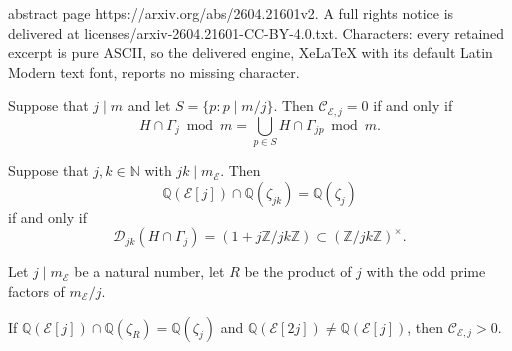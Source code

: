 \documentclass[10pt,a4paper]{amsart}
\newcommand{\Cc}{\mathcal{C}}
\newcommand{\Dc}{\mathcal{D}}
\newcommand{\E}{\mathcal{E}}
\newcommand{\N}{\mathbb{N}}
\newcommand{\Q}{\mathbb{Q}}
\newcommand{\Z}{\mathbb{Z}}
\begin{document}
abstract page https://arxiv.org/abs/2604.21601v2. A full rights notice is delivered at licenses/arxiv-2604.21601-CC-BY-4.0.txt. Characters: every retained excerpt is pure ASCII, so the delivered engine, XeLaTeX with its default Latin Modern text font, reports no missing character.
\begin{prop}\label{prop:Cejiff} Suppose that $j \mid m$ and let $S = \{p : p \mid m/j\}$. Then $\Cc_{\E, j} = 0$ if and only if 
\[H \cap \Gamma_j \bmod m = \bigcup_{p \in S}H \cap \Gamma_{jp} \bmod m.\]
\end{prop}

\begin{lemma}\label{lem:cyclotomic-lemma}
    Suppose that $j, k \in \N$ with $jk \mid m_\E$. Then 
    \[\Q(\E[j]) \cap \Q(\zeta_{jk}) = \Q(\zeta_j)\]
    if and only if 
    \[\Dc_{jk}(H \cap \Gamma_j) = (1 + j\Z/jk\Z) \subset (\Z/jk\Z)^\times.\]
\end{lemma}

\begin{theorem} \label{T4b}
    Let $j \mid m_\E$ be a natural number, let $R$ be the product of $j$ with the odd prime factors of $m_\E/j$.
    
    If $\mathbb{Q}(\E[j]) \cap \mathbb{Q}(\zeta_{R}) =\mathbb{Q}(\zeta_{j}) $ and $\mathbb{Q}(\E[2j]) \neq \mathbb{Q}(\E[j])$, then $\mathcal{C}_{\E,j}>0$.
\end{theorem}
\end{document}
